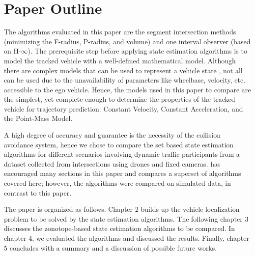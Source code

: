 \section{Paper Outline}
The algorithms evaluated in this paper are the segment intersection methods (minimizing the F-radius, P-radius, and volume) and one interval observer (based on H-$\infty$). The prerequisite step before applying state estimation algorithms is to model the tracked vehicle with a well-defined mathematical model. Although there are complex models that can be used to represent a vehicle state \cite{Althoff}, not all can be used due to the unavailability of parameters like wheelbase, velocity, etc. accessible to the ego vehicle. Hence, the models used in this paper to compare are the simplest, yet complete enough to determine the properties of the tracked vehicle for trajectory prediction: Constant Velocity, Constant Acceleration, and the Point-Mass Model.

A high degree of accuracy and guarantee is the necessity of the collision avoidance system, hence we chose to compare the set based state estimation algorithms for different scenarios involving dynamic traffic participants from a dataset collected from intersections using drones and fixed cameras. \cite{Rath} has encouraged many sections in this paper and compares a superset of algorithms covered here; however, the algorithms were compared on simulated data, in contrast to this paper.

The paper is organized as follows. Chapter 2 builds up the vehicle localization problem to be solved by the state estimation algorithms. The following chapter 3 discusses the zonotope-based state estimation algorithms to be compared. In chapter 4, we evaluated the algorithms and discussed the results. Finally, chapter 5 concludes with a summary and a discussion of possible future works.





